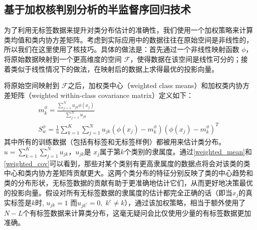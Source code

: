 \subsection{基于加权核判别分析的半监督序回归技术}
为了利用无标签数据来提升对类分布估计的准确性，我们使用一个加权策略来计算类均值和类内协方差矩阵。考虑到实际应用中的数据往往在原始空间是非线性的，所以我们在这里使用了核技巧。具体的做法是：首先通过一个非线性映射函数 \(\phi\)，将原始数据映射到一个更高维度的空间 \(\mathcal{F}\)，使得数据在该空间是线性可分的；接着类似于线性情况下的做法，在映射后的数据上求得最优的投影向量。

将原始空间映射到 \(\mathcal{F}\)之后，加权类中心（weighted class means）和加权类内协方差矩阵（weighted within-class covariance matrix）定义如下：
\begin{gather}
\label{weighted_mean}
m^{\phi}_{k}=\frac{\sum_{j=1}^{N} u_{jk}\phi(x_{j})}{\sum_{j=1}^{N} u_{jk}} \\
\label{weighted_cov}
S^{\phi}_{w}=\frac{1}{u} \sum_{k=1}^{K} \sum_{j=1}^{N} u_{jk}(\phi(x_{j})-m^{\phi}_{k})(\phi(x_{j})-m^{\phi}_{k})^{T}
\end{gather}
其中所有的训练数据（包括有标签和无标签样例）都被用来估计类分布。 \(u=\sum_{k=1}^{K} \sum_{j=1}^{N} u_{jk}\)，\(u_{jk}\)是 \(x_{j}\)属于第\(k\)个类别的隶属度。通过\autoref{weighted_mean}和\autoref{weighted_cov}可以看到，那些对某个类别有更高隶属度的数据点将会对该类的类中心和类内协方差矩阵贡献更大。这两个类分布的特征分别反映了类的中心趋势和类的分布形状，无标签数据的贡献有助于更准确地估计它们，从而更好地决策最优的投影向量。假设对所有无标签数据的隶属度的估计都完全正确的话（即当\(x_{j}\)的真实标签是\(k\)时, \(u_{jk}=1\) 而\(u_{jk^{c}}=0,\;k^{c}\neq k\)），通过该加权策略，相当于额外使用了\(N-L\)个有标签数据来计算类分布，这毫无疑问会比仅使用少量的有标签数据更加准确。

